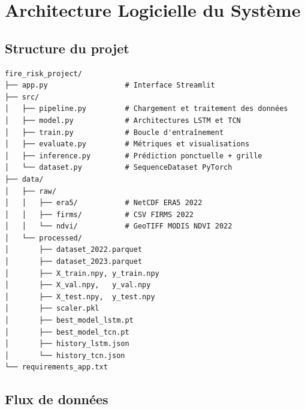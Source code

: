 \documentclass[12pt,a4paper]{report}
\begin{document}
\clearpage

\chapter{Architecture Logicielle du Système}
\label{chap:software}

\section{Structure du projet}

\begin{infobox}
\begin{verbatim}
fire_risk_project/
├── app.py                  # Interface Streamlit
├── src/
│   ├── pipeline.py         # Chargement et traitement des données
│   ├── model.py            # Architectures LSTM et TCN
│   ├── train.py            # Boucle d'entraînement
│   ├── evaluate.py         # Métriques et visualisations
│   ├── inference.py        # Prédiction ponctuelle + grille
│   └── dataset.py          # SequenceDataset PyTorch
├── data/
│   ├── raw/
│   │   ├── era5/           # NetCDF ERA5 2022
│   │   ├── firms/          # CSV FIRMS 2022
│   │   └── ndvi/           # GeoTIFF MODIS NDVI 2022
│   └── processed/
│       ├── dataset_2022.parquet
│       ├── dataset_2023.parquet
│       ├── X_train.npy, y_train.npy
│       ├── X_val.npy,   y_val.npy
│       ├── X_test.npy,  y_test.npy
│       ├── scaler.pkl
│       ├── best_model_lstm.pt
│       ├── best_model_tcn.pt
│       ├── history_lstm.json
│       └── history_tcn.json
└── requirements_app.txt
\end{verbatim}
\end{infobox}

\section{Flux de données}
\end{document}
